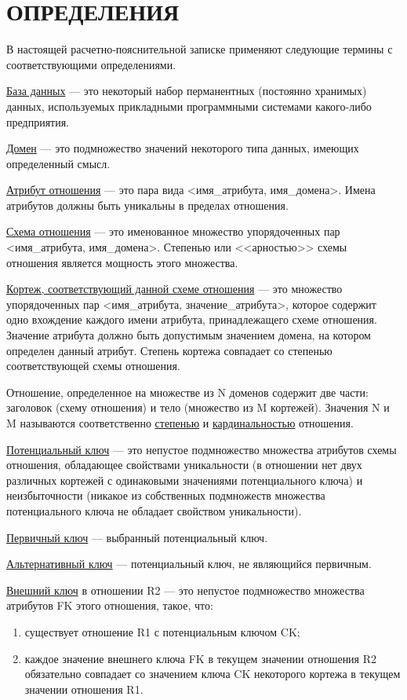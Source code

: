 \section*{ОПРЕДЕЛЕНИЯ}

В настоящей расчетно-пояснительной записке применяют следующие термины с соответствующими определениями.

\uline{База данных} --- это некоторый набор перманентных (постоянно хранимых) данных, используемых прикладными программными системами какого-либо предприятия.~\cite[с. 51]{date}

\uline{Домен} --- это подмножество значений некоторого типа данных, имеющих определенный смысл.~\cite{lecnotes}

\uline{Атрибут отношения} --- это пара вида <имя\_атрибута, имя\_домена>.
Имена атрибутов должны быть уникальны в пределах отношения.~\cite{lecnotes}

\uline{Схема отношения} --- это именованное множество упорядоченных пар <имя\_атрибута, имя\_домена>.
Степенью или <<арностью>> схемы отношения является мощность этого множества.~\cite{lecnotes}

\uline{Кортеж, соответствующий данной схеме отношения} --- это множество упорядоченных пар <имя\_атрибута, значение\_атрибута>, которое содержит одно вхождение каждого имени атрибута, принадлежащего схеме отношения.
Значение атрибута должно быть допустимым значением домена, на котором определен данный атрибут.
Степень кортежа совпадает со степенью соответствующей схемы отношения.~\cite{lecnotes}

Отношение, определенное на множестве из N доменов содержит две части: заголовок (схему отношения) и тело (множество из M кортежей).
Значения N и M называются соответственно \uline{степенью} и \uline{кардинальностью} отношения.~\cite{lecnotes}

\uline{Потенциальный ключ} --- это непустое подмножество множества атрибутов схемы отношения, обладающее свойствами уникальности (в отношении нет двух различных кортежей с одинаковыми значениями потенциального ключа) и неизбыточности (никакое из собственных подмножеств множества потенциального ключа не обладает свойством уникальности).~\cite{lecnotes}

\uline{Первичный ключ} --- выбранный потенциальный ключ.~\cite{lecnotes}

\uline{Альтернативный ключ} --- потенциальный ключ, не являющийся первичным.~\cite{lecnotes}

\uline{Внешний ключ} в отношении R2 --- это непустое подмножество множества атрибутов FK этого отношения, такое, что:
\begin{enumerate}[label=\asbuk*)]
    \item существует отношение R1 с потенциальным ключом CK;
    \item каждое значение внешнего ключа FK в текущем значении отношения R2 обязательно совпадает со значением ключа CK некоторого кортежа в текущем значении отношения R1.~\cite{lecnotes}
\end{enumerate}

